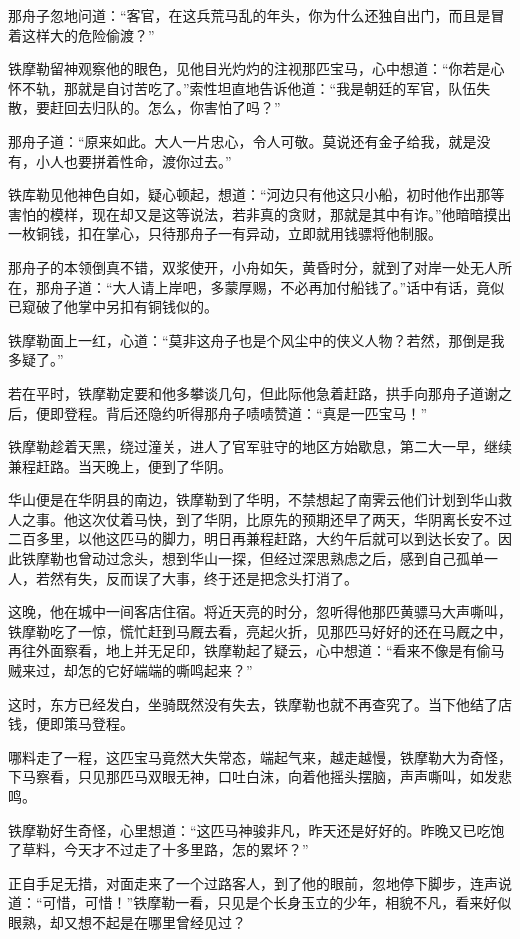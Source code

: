\documentclass[12pt,oneside]{book}
\begin{document}
那舟子忽地问道：``客官，在这兵荒马乱的年头，你为什么还独自出门，而且是冒着这样大的危险偷渡？''

铁摩勒留神观察他的眼色，见他目光灼灼的注视那匹宝马，心中想道：``你若是心怀不轨，那就是自讨苦吃了。''索性坦直地告诉他道：``我是朝廷的军官，队伍失散，要赶回去归队的。怎么，你害怕了吗？''

那舟子道：``原来如此。大人一片忠心，令人可敬。莫说还有金子给我，就是没有，小人也要拼着性命，渡你过去。''

铁库勒见他神色自如，疑心顿起，想道：``河边只有他这只小船，初时他作出那等害怕的模样，现在却又是这等说法，若非真的贪财，那就是其中有诈。''他暗暗摸出一枚铜钱，扣在掌心，只待那舟子一有异动，立即就用钱骠将他制服。

那舟子的本领倒真不错，双浆使开，小舟如矢，黄昏时分，就到了对岸一处无人所在，那舟子道：``大人请上岸吧，多蒙厚赐，不必再加付船钱了。''话中有话，竟似已窥破了他掌中另扣有铜钱似的。

铁摩勒面上一红，心道：``莫非这舟子也是个风尘中的侠义人物？若然，那倒是我多疑了。''

若在平时，铁摩勒定要和他多攀谈几句，但此际他急着赶路，拱手向那舟子道谢之后，便即登程。背后还隐约听得那舟子啧啧赞道：``真是一匹宝马！''

铁摩勒趁着天黑，绕过潼关，进人了官军驻守的地区方始歇息，第二大一早，继续兼程赶路。当天晚上，便到了华阴。

华山便是在华阴县的南边，铁摩勒到了华明，不禁想起了南霁云他们计划到华山救人之事。他这次仗着马快，到了华阴，比原先的预期还早了两天，华阴离长安不过二百多里，以他这匹马的脚力，明日再兼程赶路，大约午后就可以到达长安了。因此铁摩勒也曾动过念头，想到华山一探，但经过深思熟虑之后，感到自己孤单一人，若然有失，反而误了大事，终于还是把念头打消了。

这晚，他在城中一间客店住宿。将近天亮的时分，忽听得他那匹黄骠马大声嘶叫，铁摩勒吃了一惊，慌忙赶到马厩去看，亮起火折，见那匹马好好的还在马厩之中，再往外面察看，地上并无足印，铁摩勒起了疑云，心中想道：``看来不像是有偷马贼来过，却怎的它好端端的嘶鸣起来？''

这时，东方已经发白，坐骑既然没有失去，铁摩勒也就不再查究了。当下他结了店钱，便即策马登程。

哪料走了一程，这匹宝马竟然大失常态，端起气来，越走越慢，铁摩勒大为奇怪，下马察看，只见那匹马双眼无神，口吐白沫，向着他摇头摆脑，声声嘶叫，如发悲鸣。

铁摩勒好生奇怪，心里想道：``这匹马神骏非凡，昨天还是好好的。昨晚又已吃饱了草料，今天才不过走了十多里路，怎的累坏？''

正自手足无措，对面走来了一个过路客人，到了他的眼前，忽地停下脚步，连声说道：``可惜，可惜！''铁摩勒一看，只见是个长身玉立的少年，相貌不凡，看来好似眼熟，却又想不起是在哪里曾经见过？
\end{document}
